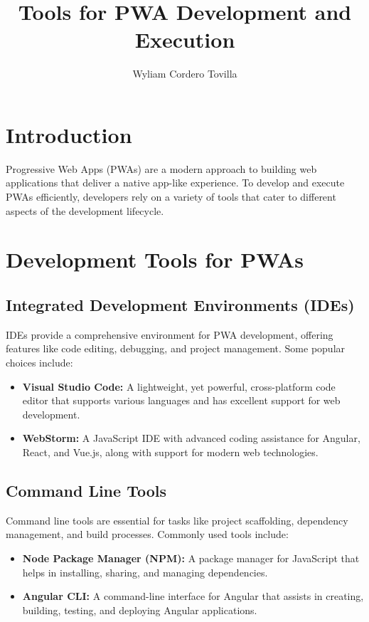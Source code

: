 \documentclass[]{article}
\title{Tools for PWA Development and Execution}
\author{Wyliam Cordero Tovilla}
\begin{document}
	
	\maketitle
	
	\section{Introduction}
	Progressive Web Apps (PWAs) are a modern approach to building web applications that deliver a native app-like experience. To develop and execute PWAs efficiently, developers rely on a variety of tools that cater to different aspects of the development lifecycle.
	
	\section{Development Tools for PWAs}
	
	\subsection{Integrated Development Environments (IDEs)}
	IDEs provide a comprehensive environment for PWA development, offering features like code editing, debugging, and project management. Some popular choices include:
	
	\begin{itemize}
		\item \textbf{Visual Studio Code:} A lightweight, yet powerful, cross-platform code editor that supports various languages and has excellent support for web development.
		
		\item \textbf{WebStorm:} A JavaScript IDE with advanced coding assistance for Angular, React, and Vue.js, along with support for modern web technologies.
	\end{itemize}
	
	\subsection{Command Line Tools}
	Command line tools are essential for tasks like project scaffolding, dependency management, and build processes. Commonly used tools include:
	
	\begin{itemize}
		\item \textbf{Node Package Manager (NPM):} A package manager for JavaScript that helps in installing, sharing, and managing dependencies.
		
		\item \textbf{Angular CLI:} A command-line interface for Angular that assists in creating, building, testing, and deploying Angular applications.
	\end{itemize}
	
\end{document}

